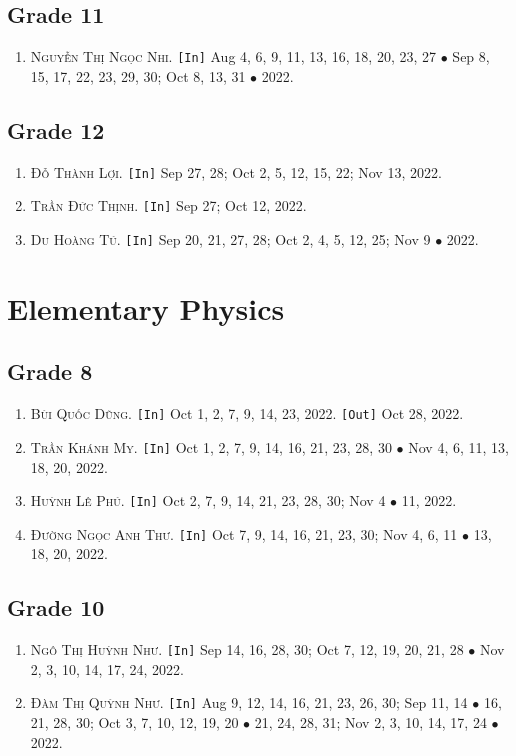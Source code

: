\documentclass{article}
\numberwithin{equation}{section}
\begin{document}
\subsection{Grade 11}
\begin{enumerate}
	\item \textsc{Nguyễn Thị Ngọc Nhi.} \texttt{[In]} Aug 4, 6, 9, 11, 13, 16, 18, 20, 23, 27 $\bullet$ Sep 8, 15, 17, 22, 23, 29, 30; Oct 8, 13, 31 $\bullet$ 2022.
\end{enumerate}

\subsection{Grade 12}
\begin{enumerate}
	\item \textsc{Đỗ Thành Lợi.} \texttt{[In]} Sep 27, 28; Oct 2, 5, 12, 15, 22; Nov 13, 2022.
	\item \textsc{Trần Đức Thịnh.} \texttt{[In]} Sep 27; Oct 12, 2022.
	\item \textsc{Du Hoàng Tú.} \texttt{[In]} Sep 20, 21, 27, 28; Oct 2, 4, 5, 12, 25; Nov 9 $\bullet$ 2022.
\end{enumerate}


\section{Elementary Physics}

\subsection{Grade 8}
\begin{enumerate}
	\item \textsc{Bùi Quốc Dũng.} \texttt{[In]} Oct 1, 2, 7, 9, 14, 23, 2022. \texttt{[Out]} Oct 28, 2022.
	\item \textsc{Trần Khánh My.} \texttt{[In]} Oct 1, 2, 7, 9, 14, 16, 21, 23, 28, 30 $\bullet$ Nov 4, 6, 11, 13, 18, 20, 2022.
	\item \textsc{Huỳnh Lê Phú.} \texttt{[In]} Oct 2, 7, 9, 14, 21, 23, 28, 30; Nov 4 $\bullet$ 11, 2022.
	\item \textsc{Đường Ngọc Anh Thư.} \texttt{[In]} Oct 7, 9, 14, 16, 21, 23, 30; Nov 4, 6, 11 $\bullet$ 13, 18, 20, 2022.
\end{enumerate}

\subsection{Grade 10}
\begin{enumerate}
	\item \textsc{Ngô Thị Huỳnh Như.} \texttt{[In]} Sep 14, 16, 28, 30; Oct 7, 12, 19, 20, 21, 28 $\bullet$ Nov 2, 3, 10, 14, 17, 24, 2022.
	\item \textsc{Đàm Thị Quỳnh Như.} \texttt{[In]} Aug 9, 12, 14, 16, 21, 23, 26, 30; Sep 11, 14 $\bullet$ 16, 21, 28, 30; Oct 3, 7, 10, 12, 19, 20 $\bullet$ 21, 24, 28, 31; Nov 2, 3, 10, 14, 17, 24 $\bullet$ 2022.
\end{enumerate}
\end{document}
